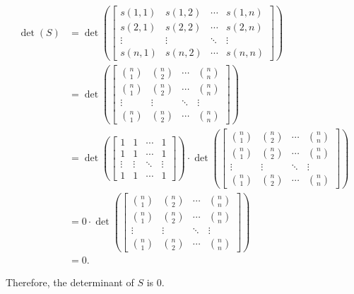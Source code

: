 \begin{align*}
\det(S) &= \det\left(\begin{bmatrix} s(1,1) & s(1,2) & \cdots & s(1,n) \\ s(2,1) & s(2,2) & \cdots & s(2,n) \\ \vdots & \vdots & \ddots & \vdots \\ s(n,1) & s(n,2) & \cdots & s(n,n) \end{bmatrix}\right) \\
&= \det\left(\begin{bmatrix} \binom{n}{1} & \binom{n}{2} & \cdots & \binom{n}{n} \\ \binom{n}{1} & \binom{n}{2} & \cdots & \binom{n}{n} \\ \vdots & \vdots & \ddots & \vdots \\ \binom{n}{1} & \binom{n}{2} & \cdots & \binom{n}{n} \end{bmatrix}\right) \\
&= \det\left(\begin{bmatrix} 1 & 1 & \cdots & 1 \\ 1 & 1 & \cdots & 1 \\ \vdots & \vdots & \ddots & \vdots \\ 1 & 1 & \cdots & 1 \end{bmatrix}\right) \cdot \det\left(\begin{bmatrix} \binom{n}{1} & \binom{n}{2} & \cdots & \binom{n}{n} \\ \binom{n}{1} & \binom{n}{2} & \cdots & \binom{n}{n} \\ \vdots & \vdots & \ddots & \vdots \\ \binom{n}{1} & \binom{n}{2} & \cdots & \binom{n}{n} \end{bmatrix}\right) \\
&= 0 \cdot \det\left(\begin{bmatrix} \binom{n}{1} & \binom{n}{2} & \cdots & \binom{n}{n} \\ \binom{n}{1} & \binom{n}{2} & \cdots & \binom{n}{n} \\ \vdots & \vdots & \ddots & \vdots \\ \binom{n}{1} & \binom{n}{2} & \cdots & \binom{n}{n} \end{bmatrix}\right) \\
&= 0.
\end{align*}

Therefore, the determinant of $S$ is $0$.
